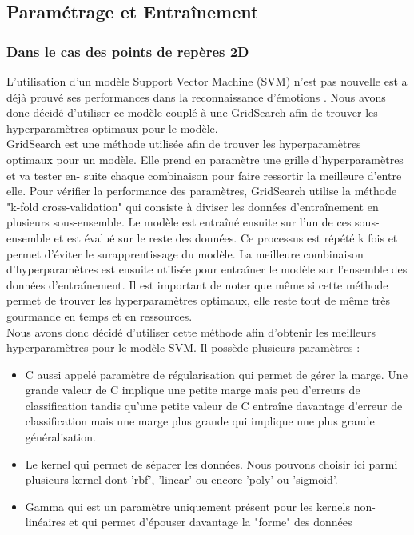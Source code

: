 \documentclass{rapport}
\begin{document}
\subsection{Paramétrage et Entraînement}

\subsubsection{Dans le cas des points de repères 2D}
L'utilisation d'un modèle Support Vector Machine (SVM) n'est pas nouvelle est a déjà prouvé ses performances dans la reconnaissance
d'émotions \cite{kalapalaFacialExpressionRecognition2020}. Nous avons donc décidé d'utiliser ce modèle couplé à une GridSearch
afin de trouver les hyperparamètres optimaux pour le modèle.\\

GridSearch est une méthode utilisée afin de trouver les hyperparamètres optimaux
pour un modèle. Elle prend en paramètre une grille d'hyperparamètres et va tester en-
suite chaque combinaison pour faire ressortir la meilleure d'entre elle. Pour vérifier la
performance des paramètres, GridSearch utilise la méthode "k-fold cross-validation" qui
consiste à diviser les données d'entraînement en plusieurs sous-ensemble. Le modèle est
entraîné ensuite sur l'un de ces sous-ensemble et est évalué sur le reste des données. Ce
processus est répété k fois et permet d'éviter le surapprentissage du modèle. La meilleure
combinaison d'hyperparamètres est ensuite utilisée pour entraîner le modèle sur l'ensemble
des données d'entraînement. Il est important de noter que même si cette méthode permet
de trouver les hyperparamètres optimaux, elle reste tout de même très gourmande en
temps et en ressources.\\

Nous avons donc décidé d'utiliser cette méthode afin d'obtenir les meilleurs hyperparamètres pour le modèle SVM. Il possède plusieurs paramètres :\\
\begin{itemize}
    \item C aussi appelé paramètre de régularisation qui permet de gérer la marge. Une grande valeur de C implique une petite marge mais peu d'erreurs de classification
          tandis qu'une petite valeur de C entraîne davantage d'erreur de classification mais une marge plus grande qui implique une plus grande généralisation.
    \item Le kernel qui permet de séparer les données. Nous pouvons choisir ici parmi plusieurs kernel dont 'rbf', 'linear' ou encore
          'poly' ou 'sigmoid'.
    \item Gamma qui est un paramètre uniquement présent pour les kernels non-linéaires et qui permet d'épouser davantage la "forme" des données\\
\end{itemize}
\end{document}
